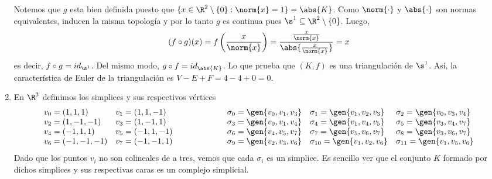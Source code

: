 \documentclass{article}
\begin{document}
\begin{enumerate}
    \vspace{2mm}
    \noindent Notemos que $g$ esta bien definida puesto que 
    $\{x\in\R^{2}\setminus\{0\}:\norm{x}=1\}=\abs{K}$. Como $\norm{\cdot}$ y $\abs{\cdot}$ son 
    normas equivalentes, inducen la misma topología y por lo tanto $g$ es continua pues 
    $\s^{1}\subseteq\R^{2}\setminus\{0\}$. Luego,
    \begin{equation*}
        (f\circ g)(x)=f\left(\frac{x}{\norm{x}}\right)
        =\frac{\frac{x}{\norm{x}}}{\abs{\frac{x}{\norm{x}}}}=x
    \end{equation*}
    es decir, $f\circ g=id_{\s^{1}}$. Del mismo modo, $g\circ f=id_{\abs{K}}$. Lo que prueba que 
    $(K,f)$ es una triangulación de $\s^{1}$. Así, la característica de Euler de la triangulación
    es $V-E+F=4-4+0=0$.

    \item En $\R^{3}$ definimos los simplices y sus respectivos vértices
    \begin{equation*}
        \begin{array}{ll}
            v_{0}=(1,1,1) & v_{1}=(1,1,-1) \\
            v_{2}=(1,-1,-1) & v_{3}=(1,-1,1) \\
            v_{4}=(-1,1,1) & v_{5}=(-1,1,-1) \\
            v_{6}=(-1,-1,-1) &v_{7}=(-1,-1,1)
        \end{array}
        \hspace{2cm}
        \begin{array}{lll}
            \sigma_{0}=\gen{v_{0},v_{1},v_{3}} & \sigma_{1}=\gen{v_{1},v_{2},v_{3}} 
            & \sigma_{2}=\gen{v_{0},v_{3},v_{4}} \\
            \sigma_{3}=\gen{v_{0},v_{1},v_{4}} & \sigma_{4}=\gen{v_{1},v_{4},v_{5}} 
            & \sigma_{5}=\gen{v_{3},v_{4},v_{7}} \\
            \sigma_{6}=\gen{v_{4},v_{5},v_{7}} & \sigma_{7}=\gen{v_{5},v_{6},v_{7}} 
            & \sigma_{8}=\gen{v_{3},v_{6},v_{7}} \\
            \sigma_{9}=\gen{v_{2},v_{3},v_{6}} & \sigma_{10}=\gen{v_{1},v_{2},v_{6}} 
            & \sigma_{11}=\gen{v_{1},v_{5},v_{6}} \\
        \end{array}
    \end{equation*}
    Dado que los puntos $v_{i}$ no son colineales de a tres, vemos que cada $\sigma_{i}$ es un 
    simplice. Es sencillo ver que el conjunto $K$ formado por dichos simplices y sus respectivas 
    caras es un complejo simplicial.
    \begin{center}
\end{center}
\end{enumerate}
\end{document}
